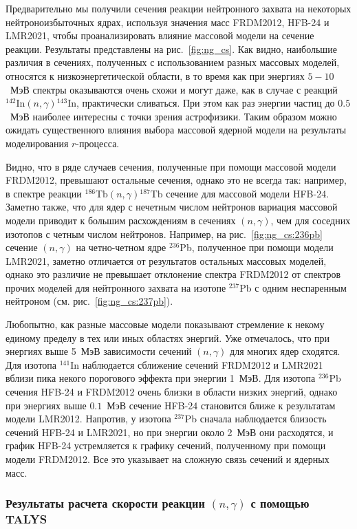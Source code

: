 Предварительно мы получили сечения реакции нейтронного захвата на некоторых нейтроноизбыточных ядрах, используя значения масс FRDM2012, HFB-24 и LMR2021, чтобы проанализировать влияние массовой модели на сечение реакции. Результаты представлены на рис.~\ref{fig:ng_cs}. Как видно, наибольшие различия в сечениях, полученных с использованием разных массовых моделей, относятся к низкоэнергетической области, в то время как при энергиях $5-10$~МэВ спектры оказываются очень схожи и могут даже, как в случае с реакций ${}^{142}\text{In}(n,\gamma){}^{143}\text{In}$, практически сливаться. При этом как раз энергии частиц до $0.5$~МэВ наиболее интересны с точки зрения астрофизики. Таким образом можно ожидать существенного влияния выбора массовой ядерной модели на результаты моделирования $r$-процесса.

Видно, что в ряде случаев сечения, полученные при помощи массовой модели FRDM2012, превышают остальные сечения, однако это не всегда так: например, в спектре реакции  ${}^{186}\text{Tb}(n,\gamma){}^{187}\text{Tb}$ сечение для массовой модели HFB-24. Заметно также, что для ядер с нечетным числом нейтронов вариация массовой модели приводит к большим расхождениям в сечениях $(n,\gamma)$, чем для соседних изотопов с четным числом нейтронов. Например, на рис.~\ref{fig:ng_cs:236pb} сечение $(n,\gamma)$ на четно-четном ядре ${}^{236}$Pb, полученное при помощи модели LMR2021, заметно отличается от результатов остальных массовых моделей, однако это различие не превышает отклонение спектра FRDM2012 от спектров прочих моделей для нейтронного захвата на изотопе ${}^{237}$Pb с одним неспаренным нейтроном (см. рис.~\ref{fig:ng_cs:237pb}).

Любопытно, как разные массовые модели показывают стремление к некому единому пределу в тех или иных областях энергий. Уже отмечалось, что при энергиях выше 5~МэВ зависимости сечений $(n,\gamma)$ для многих ядер сходятся. Для изотопа ${}^{141}$In наблюдается сближение сечений FRDM2012 и LMR2021 вблизи пика некого порогового эффекта при энергии 1~МэВ. Для изотопа ${}^{236}$Pb сечения HFB-24 и FRDM2012 очень близки в области низких энергий, однако при энергиях выше $0.1$~МэВ сечение HFB-24 становится ближе к результатам модели LMR2012. Напротив, у изотопа ${}^{237}$Pb сначала наблюдается близость сечений HFB-24 и LMR2021, но при энергии около 2~МэВ они расходятся, и график HFB-24 устремляется к графику сечений, полученному при помощи модели FRDM2012. Все это указывает на сложную связь сечений и ядерных масс.

\subsubsection{Результаты расчета скорости реакции $(n,\gamma)$ с помощью TALYS}

